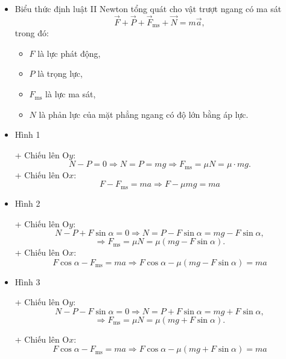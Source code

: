\begin{itemize}
	\item Biểu thức định luật II Newton tổng quát cho vật trượt ngang có ma sát
	\begin{equation*}
		\vec{F} +\vec{P} + \vec{F}_{\text{ms}} + \vec{N} =m\vec{a},
	\end{equation*}
	trong đó:
		\begin{itemize}
			\item $F$ là lực phát động,
			\item $P$ là trọng lực,
			\item $F_{\text{ms}}$ là lực ma sát, 
			\item $N$ là phản lực của mặt phẳng ngang có độ lớn bằng áp lực.
		\end{itemize}

	\item Hình 1
	
	+ Chiếu lên O$y$: 
	\begin{equation*}
		N-P =0  \Rightarrow N = P = mg \Rightarrow F_{\text{ms}} = \mu N = \mu \cdot mg.
	\end{equation*}
	+ Chiếu lên O$x$: 
	\begin{equation*}
		F-F_{\text{ms}} = ma \Rightarrow F - \mu mg =ma
	\end{equation*}
	\item Hình 2
	
	+ Chiếu lên O$y$: 
	\begin{equation*}
		N-P + F\sin \alpha =0  \Rightarrow N = P - F\sin \alpha = mg - F\sin \alpha,
	\end{equation*}
	\begin{equation*}
		\Rightarrow F_{\text{ms}} = \mu N = \mu (mg - F\sin \alpha).
	\end{equation*}
	+ Chiếu lên O$x$: 
	\begin{equation*}
		F\cos \alpha-F_{\text{ms}} = ma \Rightarrow F\cos \alpha - \mu (mg-F\sin \alpha) =ma
	\end{equation*}
	
	\item Hình 3
	
	+ Chiếu lên O$y$: 
	\begin{equation*}
		N-P - F\sin \alpha =0  \Rightarrow N = P + F\sin \alpha = mg + F\sin \alpha,
	\end{equation*}
	\begin{equation*}
		\Rightarrow F_{\text{ms}} = \mu N = \mu (mg + F\sin \alpha).
	\end{equation*}

	+ Chiếu lên O$x$: 
	\begin{equation*}
		F\cos \alpha-F_{\text{ms}} = ma \Rightarrow F\cos \alpha - \mu (mg+F\sin \alpha) =ma
	\end{equation*}
\end{itemize}


